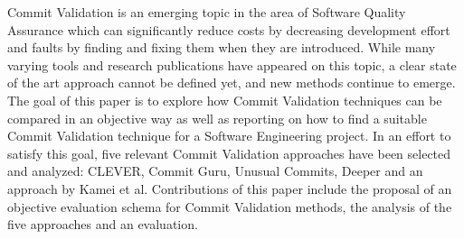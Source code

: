 
Commit Validation is an emerging topic in the area of Software Quality Assurance which can significantly reduce costs by decreasing development effort and faults by finding and fixing them when they are introduced. While many varying tools and research publications have appeared on this topic, a clear state of the art approach 
cannot be defined yet, and new methods continue to emerge.
The goal of this paper is to explore how Commit Validation techniques can be compared in an objective way as well as reporting on how to find a suitable Commit Validation technique for a Software Engineering project.
In an effort to satisfy this goal, five relevant Commit Validation approaches have been selected and analyzed: CLEVER, Commit Guru, Unusual Commits, Deeper and an approach by Kamei et al.
Contributions of this paper include the proposal of an objective evaluation schema for Commit Validation methods, the analysis of the five approaches and an evaluation.